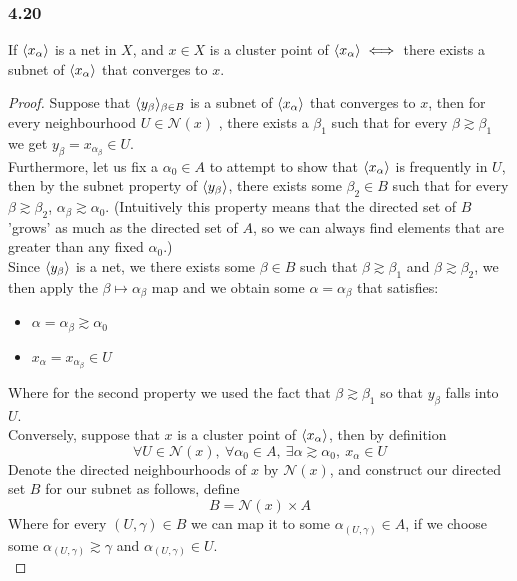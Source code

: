 \documentclass[../../main.tex]{subfiles}
\begin{document}
\subsubsection*{4.20}
\newcommand{\xa}{\abrackets{x_\alpha}} %
\newcommand{\n}[1]{\mathcal{N}({#1})} %
\begin{wts}
If $\xa$ is a net in $X$, and $x\in X$ is a cluster point of $\xa\iff$ there exists a subnet of $\xa$ that converges to $x$.
\end{wts}
\begin{proof}
Suppose that $\langle {y_\beta} \rangle_{\beta\in B}$ is a subnet of $\xa$ that converges to $x$, then for every neighbourhood $U\in\n{x}$ , there exists a $\beta_1$ such that for every $\beta\gtrsim\beta_1$ we get $y_\beta = x_{\alpha_\beta}\in U$.\\

Furthermore, let us fix a $\alpha_0\in A$ to attempt to show that $\xa$ is frequently in $U$, then by the subnet property of $\langle {y_\beta} \rangle$, there exists some $\beta_2\in B$ such that for every $\beta\gtrsim\beta_2$, $\alpha_\beta\gtrsim \alpha_0$. (Intuitively this property means that the directed set of $B$ 'grows' as much as the directed set of $A$, so we can always find elements that are greater than any fixed $\alpha_0$.)\\

Since $\langle {y_\beta} \rangle$ is a net, we there exists some $\beta\in B$ such that $\beta\gtrsim\beta_1$ and $\beta\gtrsim\beta_2$, we then apply the $\beta\mapsto \alpha_\beta$ map and we obtain some $\alpha=\alpha_\beta$ that satisfies:
\begin{itemize}
    \item $\alpha=\alpha_\beta\gtrsim\alpha_0$
    \item $x_\alpha = x_{\alpha_\beta}\in U$
\end{itemize}
Where for the second property we used the fact that $\beta\gtrsim\beta_1$ so that $y_\beta$ falls into $U$.\\

Conversely, suppose that $x$ is a cluster point of $\xa$, then by definition
\[
\forall U\in\n{x},\:\forall\alpha_0\in A,\:\exists\alpha\gtrsim\alpha_0,\:x_\alpha\in U
\]
Denote the directed neighbourhoods of $x$ by $\n{x}$, and construct our directed set $B$ for our subnet as follows, define
\[
B = \n{x}\times A
\]
Where for every $(U,\gamma)\in B$ we can map it to some $\alpha_{(U,\gamma)}\in A$, if we choose some $\alpha_{(U,\gamma)}\gtrsim\gamma$ and $\alpha_{(U,\gamma)}\in U$. \\


\end{proof}
\end{document}
